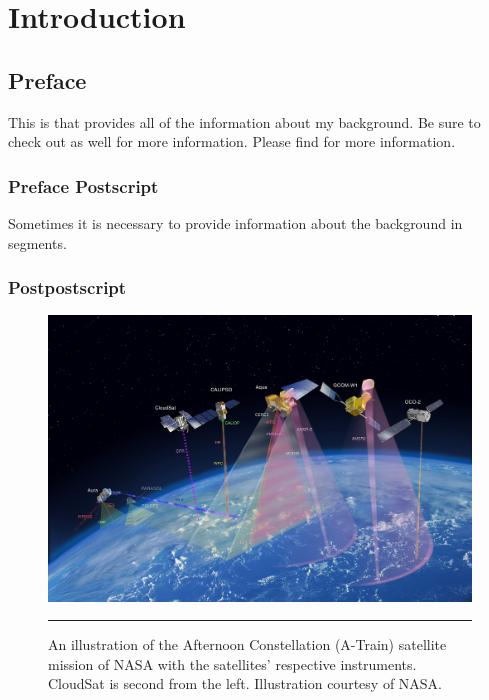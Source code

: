 
\chapter{Introduction} %

\label{Chapter1} %


\section{Preface}\label{section:preface}
This is  that provides all of the information about my background. Be sure to check out  as well for more information. Please find  for more information.

\subsection{Preface Postscript}\label{subsection:postscript}
Sometimes it is necessary to provide information about the background in segments.

\subsection{Postpostscript}

\begin{figure}[h]
\centering
	\includegraphics[width=0.6\linewidth]{Figures/atrain.jpeg}
	\rule{35em}{0.5pt}
	\caption[Afternoon Constellation illustration]{An illustration of the Afternoon Constellation (A-Train) satellite mission of NASA with the satellites' respective instruments. CloudSat is second from the left. Illustration courtesy of NASA.}\label{atrain}
\end{figure}

